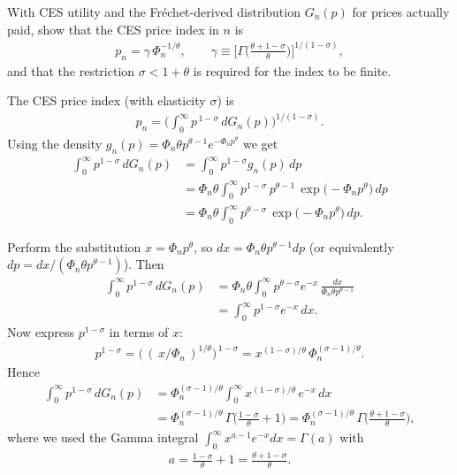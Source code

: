 
With CES utility and the Fréchet-derived distribution $G_n(p)$ for prices actually paid, show that the CES price index in $n$ is
\begin{align*}
p_n = \gamma\, \Phi_n^{-1/\theta}, \qquad
\gamma \equiv \Bigg[\Gamma\!\Big(\frac{\theta+1-\sigma}{\theta}\Big)\Bigg]^{\!1/(1-\sigma)},
\end{align*}
and that the restriction $\sigma<1+\theta$ is required for the index to be finite.


\begin{solution}
The CES price index (with elasticity $\sigma$) is
\begin{align*}
p_n = \Bigg(\int_0^\infty p^{\,1-\sigma}\, dG_n(p)\Bigg)^{\!1/(1-\sigma)}.
\end{align*}
Using the density $g_n(p)=\Phi_n\theta p^{\theta-1}e^{-\Phi_n p^{\theta}}$ we get
\begin{align*}
\int_0^\infty p^{1-\sigma}\, dG_n(p)
&= \int_0^\infty p^{1-\sigma} g_n(p)\, dp \\
&= \Phi_n \theta \int_0^\infty p^{1-\sigma}\, p^{\theta-1}\,
    \exp\!\big(-\Phi_n p^{\theta}\big)\, dp \\
&= \Phi_n \theta \int_0^\infty p^{\theta-\sigma}\,
    \exp\!\big(-\Phi_n p^{\theta}\big)\, dp.
\end{align*}

Perform the substitution $x=\Phi_n p^{\theta}$, so $dx=\Phi_n\theta p^{\theta-1}dp$ (or equivalently $dp=dx/(\Phi_n\theta p^{\theta-1})$). Then
\begin{align*}
\int_0^\infty p^{1-\sigma}\, dG_n(p)
&= \Phi_n \theta \int_0^\infty p^{\theta-\sigma} e^{-x}\, \frac{dx}{\Phi_n\theta p^{\theta-1}} \\
&= \int_0^\infty p^{1-\sigma} e^{-x}\, dx.
\end{align*}
Now express $p^{1-\sigma}$ in terms of $x$:
\begin{align*}
p^{1-\sigma} = \big(\,(\,x/\Phi_n\,)^{1/\theta}\big)^{\,1-\sigma}
= x^{(1-\sigma)/\theta}\, \Phi_n^{(\sigma-1)/\theta}.
\end{align*}
Hence
\begin{align*}
\int_0^\infty p^{1-\sigma}\, dG_n(p)
&= \Phi_n^{(\sigma-1)/\theta} \int_0^\infty x^{(1-\sigma)/\theta}\, e^{-x}\, dx \\
&= \Phi_n^{(\sigma-1)/\theta}\, \Gamma\!\Big(\frac{1-\sigma}{\theta}+1\Big)
= \Phi_n^{(\sigma-1)/\theta}\, \Gamma\!\Big(\frac{\theta+1-\sigma}{\theta}\Big),
\end{align*}
where we used the Gamma integral $\displaystyle\int_0^\infty x^{a-1}e^{-x}dx=\Gamma(a)$ with
\begin{align*}
a = \frac{1-\sigma}{\theta}+1 = \frac{\theta+1-\sigma}{\theta}.
\end{align*}


\end{solution}
